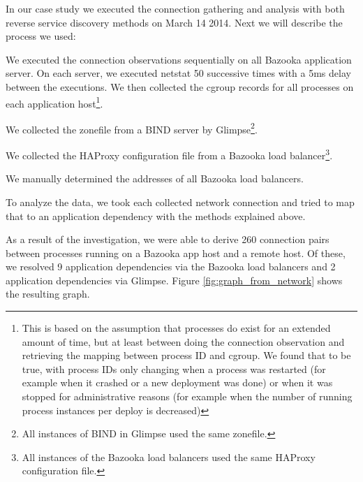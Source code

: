 
In our case study we executed the connection gathering and analysis with both reverse service discovery methods on March 14 2014. Next we will describe the process we used:
\begin{titemize}
  \item We executed the connection observations sequentially on all Bazooka application server. On each server, we executed netstat 50 successive times with a 5ms delay between the executions. We then collected the cgroup records for all processes on each application host\footnote{ This is based on the assumption that processes do exist for an extended amount of time, but at least between doing the connection observation and retrieving the mapping between process ID and cgroup. We found that to be true, with process IDs only changing when a process was restarted (for example when it crashed or a new deployment was done) or when it was stopped for administrative reasons (for example when the number of running process instances per deploy is decreased)}.
  \item We collected the zonefile from a BIND server by Glimpse\footnote{All instances of BIND in Glimpse used the same zonefile.}.
  \item We collected the HAProxy configuration file from a Bazooka load balancer\footnote{All instances of the Bazooka load balancers used the same HAProxy configuration file.}.
  \item We manually determined the addresses of all Bazooka load balancers.
  \item To analyze the data, we took each collected network connection and tried to map that to an application dependency with the methods explained above.
\end{titemize}

As a result of the investigation, we were able to derive 260 connection pairs between processes running on a Bazooka app host and a remote host. Of these, we resolved 9 application dependencies via the Bazooka load balancers and 2 application dependencies via Glimpse. Figure \ref{fig:graph_from_network} shows the resulting graph.

